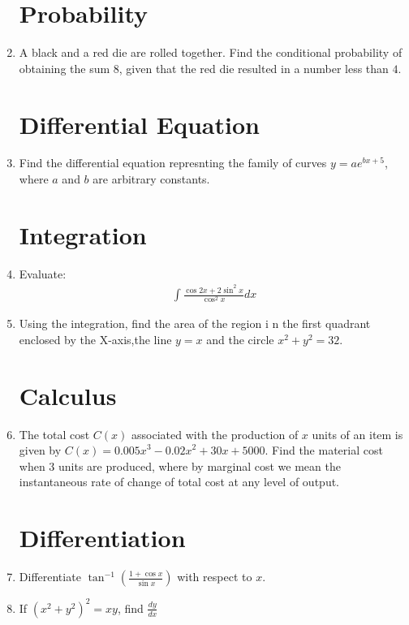 \documentclass[10pt,-letter paper]{article}
\providecommand{\brak}[1]{\ensuremath{\left(#1\right)}}
\begin{document}
\begin{enumerate}
\section{Probability}
\item A black and a red die are rolled together. Find the conditional probability of obtaining the sum $8$, given that the red die resulted in a number less than $4$.




\section{Differential Equation}
\item Find the differential equation represnting the family of curves $y=ae^{bx+5}$, where $a$ and $b$ are arbitrary constants.






\section{Integration}	
\item Evaluate:
\begin{align*}
\int\frac{\cos 2x+2\sin^{2}x}{\cos^{2}x}dx
\end{align*}
   

\item Using the integration, find the area of the region i n the first quadrant enclosed by the X-axis,the line $y=x$ and the circle $x^{2}+y^{2}=32$.





\section{Calculus}
\item The total cost $C\brak{x}$ associated with the production of $x$ units of an item is given by $C\brak{x} = {0.005x}^3-{0.02x}^2+30x+5000$. Find the material cost when $3$ units are produced, where by marginal cost we mean the instantaneous rate of change of total cost at any level of output.




\section{Differentiation}
\item Differentiate  $\tan^{-1}\brak{\frac{1+\cos x}{\sin x}}$ with respect to $x$.
\item If ${\brak{x^{2}+y^{2}}}^{2}=xy$, find $\frac{dy}{dx}$



\end{enumerate}
\end{document}
